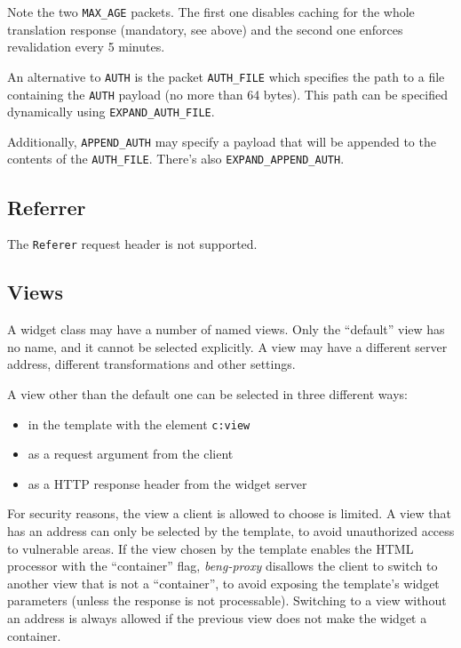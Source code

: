 \documentclass[a4paper,12pt]{article}
\begin{document}
Note the two \verb|MAX_AGE| packets.  The first one disables caching
for the whole translation response (mandatory, see above) and the
second one enforces revalidation every 5 minutes.

An alternative to \verb|AUTH| is the packet \verb|AUTH_FILE| which
specifies the path to a file containing the \verb|AUTH| payload (no
more than 64 bytes).  This path can be specified dynamically using
\verb|EXPAND_AUTH_FILE|.

Additionally, \verb|APPEND_AUTH| may specify a payload that will be
appended to the contents of the \verb|AUTH_FILE|.  There's also
\verb|EXPAND_APPEND_AUTH|.


\subsection{Referrer}

The \texttt{Referer} request header is not supported.

\subsection{Views}

A widget class may have a number of named views.  Only the ``default''
view has no name, and it cannot be selected explicitly.  A view may
have a different server address, different transformations and other
settings.

A view other than the default one can be selected in three different
ways:

\begin{itemize}
\item in the template with the element \texttt{c:view}
\item as a request argument from the client
\item as a HTTP response header from the widget server
\end{itemize}

For security reasons, the view a client is allowed to choose is
limited.  A view that has an address can only be selected by the
template, to avoid unauthorized access to vulnerable areas.  If the
view chosen by the template enables the HTML processor with the
``container'' flag, \emph{beng-proxy} disallows the client to switch
to another view that is not a ``container'', to avoid exposing the
template's widget parameters (unless the response is not processable).
Switching to a view without an address is always allowed if the
previous view does not make the widget a container.
\end{document}
